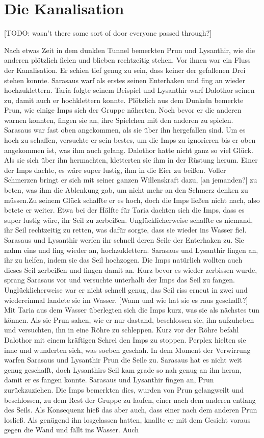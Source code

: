\documentclass[10pt,twoside,twocolumn,openany]{book}
\begin{document}
	\section{Die Kanalisation}
	
	[TODO: wasn't there some sort of door everyone passed through?]
	
	Nach etwas Zeit in dem dunklen Tunnel bemerkten Prun und Lysanthir, wie die anderen plötzlich fielen und blieben rechtzeitig stehen. Vor ihnen war ein Fluss der Kanalisation. Er schien tief genug zu sein, dass keiner der gefallenen Drei stehen konnte. Sarasaus warf als erstes seinen Enterhaken und fing an wieder hochzuklettern. Taria folgte seinem Beispiel und Lysanthir warf Dalothor seinen zu, damit auch er hochklettern konnte. Plötzlich aus dem Dunkeln bemerkte Prun, wie einige Imps sich der Gruppe näherten. Noch bevor er die anderen warnen konnten, fingen sie an, ihre Spielchen mit den anderen zu spielen. Sarasaus war fast oben angekommen, als sie über ihn hergefallen sind. Um es hoch zu schaffen, versuchte er sein bestes, um die Imps zu ignorieren bis er oben angekommen ist, was ihm auch gelang. Dalothor hatte nicht ganz so viel Glück. Als sie sich über ihn hermachten, kletterten sie ihm in der Rüstung herum. Einer der Imps dachte, es wäre super lustig, ihm in die Eier zu beißen. Voller Schmerzen bringt er sich mit seiner ganzen Willenskraft dazu, [an jemanden?] zu beten, was ihm die Ablenkung gab, um nicht mehr an den Schmerz denken zu müssen.Zu seinem Glück schaffte er es hoch, doch die Imps ließen nicht nach, also betete er weiter. Etwa bei der Hälfte für Taria dachten sich die Imps, dass es super lustig wäre, ihr Seil zu zerbeißen. Unglücklicherweise schaffte es niemand, ihr Seil rechtzeitig zu retten, was dafür sorgte, dass sie wieder ins Wasser fiel. Sarasaus und Lysanthir werfen ihr schnell deren Seile der Enterhaken zu. Sie nahm eins und fing wieder an, hochzuklettern. Sarasaus und Lysanthir fingen an, ihr zu helfen, indem sie das Seil hochzogen. Die Imps natürlich wollten auch dieses Seil zerbeißen und fingen damit an. Kurz bevor es wieder zerbissen wurde, sprang Sarasaus vor und versuchte unterhalb der Imps das Seil zu fangen. Unglücklicherweise war er nicht schnell genug, das Seil riss erneut in zwei und wiedereinmal landete sie im Wasser. [Wann und wie hat sie es raus geschafft?] Mit Taria aus dem Wasser überlegten sich die Imps kurz, was sie als nächstes tun können. Als sie Prun sahen, wie er nur dastand, beschlossen sie, ihn aufzuheben und versuchten, ihn in eine Röhre zu schleppen. Kurz vor der Röhre befahl Dalothor mit einem kräftigen Schrei den Imps zu stoppen. Perplex hielten sie inne und wunderten sich, was soeben geschah. In dem Moment der Verwirrung warfen Sarasaus und Lysanthir Prun die Seile zu. Sarasaus hat es nicht weit genug geschafft, doch Lysanthirs Seil kam grade so nah genug an ihn heran, damit er es fangen konnte. Sarasaus und Lysanthir fingen an, Prun zurückzuziehen. Die Imps bemerkten dies, wurden von Prun gelangweilt und beschlossen, zu dem Rest der Gruppe zu laufen, einer nach dem anderen  entlang des Seils. Als Konsequenz hieß das aber auch, dass einer nach dem anderen Prun losließ. Als genügend ihn losgelassen hatten, knallte er mit dem Gesicht voraus gegen die Wand und fällt ins Wasser. Auch 
\end{document}
